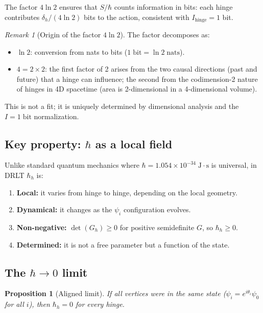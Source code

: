 \documentclass[12pt]{article}
\newtheorem{proposition}[theorem]{Proposition}
\theoremstyle{remark}
\newtheorem{remark}[theorem]{Remark}
\theoremstyle{definition}
\begin{document}
The factor $4\ln 2$ ensures that $S/\hbar$ counts information in bits: each hinge contributes $\delta_h/(4\ln 2)$ bits to the action, consistent with $I_\text{hinge} = 1$ bit.

\begin{remark}[Origin of the factor $4\ln 2$]
\label{rem:4ln2}
The factor decomposes as:
\begin{itemize}
\item $\ln 2$: conversion from nats to bits ($1\;\text{bit} = \ln 2\;\text{nats}$).
\item $4 = 2 \times 2$: the first factor of 2 arises from the two causal directions (past and future) that a hinge can influence; the second from the codimension-2 nature of hinges in 4D spacetime (area is 2-dimensional in a 4-dimensional volume).
\end{itemize}
This is not a fit; it is uniquely determined by dimensional analysis and the $I = 1\;\text{bit}$ normalization.
\end{remark}

\subsection{Key property: $\hbar$ as a local field}

Unlike standard quantum mechanics where $\hbar = 1.054 \times 10^{-34}\;\text{J}\cdot\text{s}$ is universal, in DRLT $\hbar_h$ is:

\begin{enumerate}
\item \textbf{Local:} it varies from hinge to hinge, depending on the local geometry.
\item \textbf{Dynamical:} it changes as the $\psi_i$ configuration evolves.
\item \textbf{Non-negative:} $\det(G_h) \geq 0$ for positive semidefinite $G$, so $\hbar_h \geq 0$.
\item \textbf{Determined:} it is not a free parameter but a function of the state.
\end{enumerate}

\subsection{The $\hbar \to 0$ limit}

\begin{proposition}[Aligned limit]
If all vertices were in the same state ($\psi_i = e^{i\theta_i}\psi_0$ for all $i$), then $\hbar_h = 0$ for every hinge.
\end{proposition}
\end{document}
